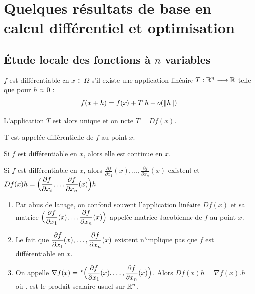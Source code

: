 \section{Quelques résultats de base en calcul différentiel et optimisation}

\subsection{Étude locale des fonctions à $n$ variables}

\begin{fdef}
    $f$ est différentiable en $x \in \Omega$ s'il existe une application linéaire 
    $T : \mathbb{R}^n \longrightarrow \mathbb{R}$ telle que pour $h \approx 0$ :
    \[
        f(x+h) = f(x) + T \; h + o(\left\lVert h\right\rVert)
    \]

    L'application $T$ est alors unique et on note $T = Df(x)$.

    T est appelée différentielle de $f$ au point $x$.
\end{fdef}

\begin{remark}
    Si $f$ est différentiable en $x$, alors elle est continue en $x$.
\end{remark}

\begin{lemme}
    Si $f$ est différentiable en $x$, alors $\displaystyle \frac{\partial f}{\partial x_1}(x), \dots , \displaystyle \frac{\partial f}{\partial x_n}(x)$ existent et
    $Df(x)h = \Big( \displaystyle\frac{\partial f}{\partial x_i}, \dots \displaystyle\frac{\partial f}{\partial x_n}(x) \Big) h$
\end{lemme}

\begin{remark}
    \begin{enumerate}
        \item Par abus de lanage, on confond souvent l'application linéaire $Df(x)$ et sa
            matrice $\Big( \displaystyle\frac{\partial f}{\partial x_1}(x), \dots \displaystyle\frac{\partial f}{\partial x_n}(x) \Big)$ appelée
            matrice Jacobienne de $f$ au point $x$.

        \item Le fait que $\displaystyle\frac{\partial f}{\partial x_1} (x), \dots, \displaystyle\frac{\partial f}{\partial x_n}(x)$ existent
            n'implique pas que $f$ est différentiable en $x$.

        \item On appelle $\nabla f(x) = \,^t\Big( \displaystyle\frac{\partial f}{\partial x_1}(x), \dots, \displaystyle\frac{\partial f}{\partial x_n}(x) \Big)$. Alors $Df(x)h = \nabla f(x) . h$ où $.$ est le produit scalaire usuel sur
            $\mathbb{R}^n$.
    \end{enumerate}
\end{remark}

